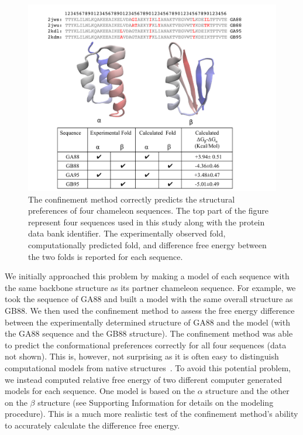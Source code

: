 \documentclass[12pt]{article}
\begin{document}
\begin{figure}
    \begin{center}
    \includegraphics[width=5.0in]{orban.pdf}
    \end{center}
    \caption{The confinement method correctly predicts the structural preferences of four chameleon sequences. The top
        part of the figure represent four sequences used in this study along with the protein data bank identifier. The
        experimentally observed fold, computationally predicted fold, and difference free energy between the two folds
        is reported for each sequence.}
\label{fig:orban}
\end{figure}

We initially approached this problem by making a model of each sequence with the same backbone structure as its partner
chameleon sequence. For example, we took the sequence of GA88 and built a model with the same overall structure as GB88.
We then used the confinement method to assess the free energy difference between the experimentally determined structure
of GA88 and the model (with the GA88 sequence and the GB88 structure). The confinement method was able to predict the
conformational preferences correctly for all four sequences (data not shown). This is, however, not surprising as it is
often easy to distinguish computational models from native structures~\cite{Handl2009,Sheffler2009}. To avoid this
potential problem, we instead computed relative free energy of two different computer generated models for each
sequence. One model is based on the $\alpha$ structure and the other on the $\beta$ structure (see Supporting
Information for details on the modeling procedure). This is a much more realistic test of the confinement method's
ability to accurately calculate the difference free energy.
\end{document}
